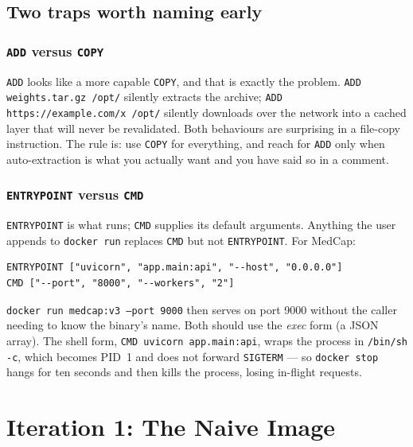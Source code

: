 \documentclass[10pt,a4paper]{article}
\newcommand{\cmd}[1]{\texttt{\small #1}}
\begin{document}
\subsection{Two traps worth naming early}

\subsubsection{\texttt{ADD} versus \texttt{COPY}}

\texttt{ADD} looks like a more capable \texttt{COPY}, and that is exactly
the problem. \texttt{ADD weights.tar.gz /opt/} silently extracts the
archive; \texttt{ADD https://example.com/x /opt/} silently downloads
over the network into a cached layer that will never be revalidated.
Both behaviours are surprising in a file-copy instruction. The rule is:
use \texttt{COPY} for everything, and reach for \texttt{ADD} only when
auto-extraction is what you actually want and you have said so in a
comment.

\subsubsection{\texttt{ENTRYPOINT} versus \texttt{CMD}}

\texttt{ENTRYPOINT} is what runs; \texttt{CMD} supplies its default
arguments. Anything the user appends to \cmd{docker run} replaces
\texttt{CMD} but not \texttt{ENTRYPOINT}. For MedCap:

\begin{lstlisting}[style=dfile]
ENTRYPOINT ["uvicorn", "app.main:api", "--host", "0.0.0.0"]
CMD ["--port", "8000", "--workers", "2"]
\end{lstlisting}

\cmd{docker run medcap:v3 --port 9000} then serves on port 9000 without
the caller needing to know the binary's name. Both should use the
\emph{exec} form (a JSON array). The shell form,
\cmd{CMD uvicorn app.main:api}, wraps the process in
\texttt{/bin/sh -c}, which becomes PID~1 and does not forward
\texttt{SIGTERM} --- so \cmd{docker stop} hangs for ten seconds and then
kills the process, losing in-flight requests.

\section{Iteration 1: The Naive Image}
\end{document}
